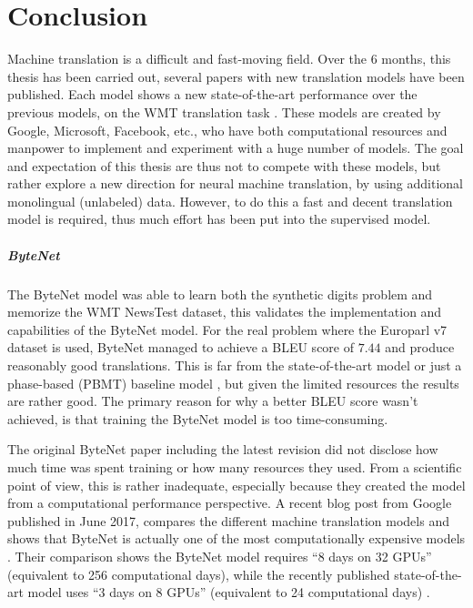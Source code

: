 \chapter{Conclusion}

Machine translation is a difficult and fast-moving field. Over the 6 months, this thesis has been carried out, several papers with new translation models have been published. Each model shows a new state-of-the-art performance over the previous models, on the WMT translation task \cite{bytenet, attention-is-all-you-need, tensor2tensor}. These models are created by Google, Microsoft, Facebook, etc., who have both computational resources and manpower to implement and experiment with a huge number of models. The goal and expectation of this thesis are thus not to compete with these models, but rather explore a new direction for neural machine translation, by using additional monolingual (unlabeled) data. However, to do this a fast and decent translation model is required, thus much effort has been put into the supervised model.

\paragraph{ByteNet} The ByteNet model was able to learn both the synthetic digits problem and memorize the WMT NewsTest dataset, this validates the implementation and capabilities of the ByteNet model. For the real problem where the Europarl v7 dataset is used, ByteNet managed to achieve a BLEU score of $7.44$ and produce reasonably good translations. This is far from the state-of-the-art model \cite{attention-is-all-you-need} or just a phase-based (PBMT) baseline model \cite{tensor2tensor}, but given the limited resources the results are rather good. The primary reason for why a better BLEU score wasn't achieved, is that training the ByteNet model is too time-consuming.

The original ByteNet paper including the latest revision did not disclose how much time was spent training or how many resources they used. From a scientific point of view, this is rather inadequate, especially because they created the model from a computational performance perspective. A recent blog post from Google published in June 2017, compares the different machine translation models and shows that ByteNet is actually one of the most computationally expensive models \cite{tensor2tensor}. Their comparison shows the ByteNet model requires ``8 days on 32 GPUs'' (equivalent to 256 computational days), while the recently published state-of-the-art model \cite{attention-is-all-you-need} uses ``3 days on 8 GPUs'' (equivalent to 24 computational days) \cite{tensor2tensor}. 


